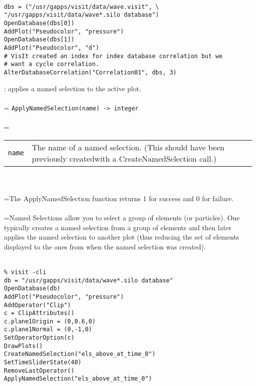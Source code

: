 \documentclass[10pt,a4paper]{report}
\begin{document}
\\[-6mm]
\begin{verbatim}dbs = ("/usr/gapps/visit/data/wave.visit", \
"/usr/gapps/visit/data/wave*.silo database")
OpenDatabase(dbs[0])
AddPlot("Pseudocolor", "pressure")
OpenDatabase(dbs[1])
AddPlot("Pseudocolor", "d")
# VisIt created an index for index database correlation but we 
# want a cycle correlation.
AlterDatabaseCorrelation("Correlation01", dbs, 3)
\end{verbatim}
\newpage


{}
: applies a named selection to the active plot.\\[-3mm]

 \\ 
\hangindent=\parindent 
\verb!ApplyNamedSelection(name) -> integer!\\ [-3mm]

 \\ 
\hangindent=\parindent 
\begin{tabular}{lp{9cm}}
\verb!name! & The name of a named selection.  (This should have been previously createdwith a CreateNamedSelection call.) \\
\end{tabular} \\[-2mm]


 \\ 
\hangindent=\parindent The ApplyNamedSelection function returns 1 for success and 0 for failure. \\[-3mm] 

 \\ 
\hangindent=\parindent Named Selections allow you to select a group of elements (or particles). One typically creates a named selection from a group of elements and then later applies the named selection to another plot (thus reducing the set of elements displayed to the ones from when the named selection was created). \\[-3mm] 

\\[-6mm]
\begin{verbatim}% visit -cli
db = "/usr/gapps/visit/data/wave*.silo database"
OpenDatabase(db)
AddPlot("Pseudocolor", "pressure")
AddOperator("Clip")
c = ClipAttributes()
c.plane1Origin = (0,0.6,0)
c.plane1Normal = (0,-1,0)
SetOperatorOption(c)
DrawPlots()
CreateNamedSelection("els_above_at_time_0")
SetTimeSliderState(40)
RemoveLastOperator()
ApplyNamedSelection("els_above_at_time_0")
\end{verbatim}
\newpage
\end{document}

